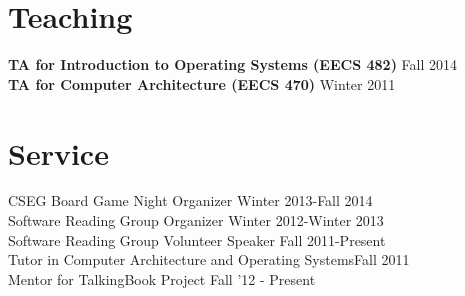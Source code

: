 \documentclass[margin, 10pt]{res} %
\begin{document}
\begin{resume}
\section{Teaching}
\textbf{TA for Introduction to Operating Systems (EECS 482)} \hfill Fall 2014 \\
\textbf{TA for Computer Architecture (EECS 470)} \hfill Winter 2011 \\

%
%
%

\section{Service}
CSEG Board Game Night Organizer \hfill Winter 2013-Fall 2014 \\
Software Reading Group Organizer \hfill Winter 2012-Winter 2013 \\
Software Reading Group Volunteer Speaker \hfill Fall 2011-Present \\
Tutor in Computer Architecture and Operating Systems\hfill Fall 2011 \\
Mentor for TalkingBook Project \hfill Fall '12 - Present \\

\end{resume}
\end{document}
